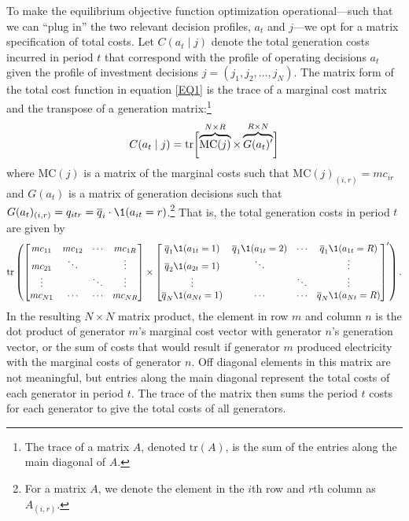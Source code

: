 To make the equilibrium objective function optimization operational---such that we can ``plug in'' the two relevant decision profiles, $a_t$ and $j$---we opt for a matrix specification of total costs. Let $C(a_t \mid j)$ denote the total generation costs incurred in period $t$ that correspond with the profile of operating decisions $a_t$ given the profile of investment decisions $j = (j_1, j_2, \ldots, j_N)$. The matrix form of the total cost function in equation \eqref{EQ1} is the trace of a marginal cost matrix and the transpose of a generation matrix:\footnote{The trace of a matrix $A$, denoted $\text{tr}(A)$, is the sum of the entries along the main diagonal of $A$.} 
\begin{equation}\label{C_matrix}
    C (a_t \mid j) = \text{tr}\biggl[ \overbrace{\text{MC}(j)}^{N \times R} \times \overbrace{G(a_t)'}^{R \times N} \biggr] \\
\end{equation}
where $\text{MC}(j)$ is a matrix of the marginal costs such that $\text{MC}(j)_{(i,r)} = mc_{ir}$ and $G(a_t)$ is a matrix of generation decisions such that $G(a_t)_{(i,r)} = q_{itr} = \overline{q}_i \cdot \1(a_{it} = r)$.\footnote{For a matrix $A$, we denote the element in the $i$th row and $r$th column as $A_{(i,r)}$.} That is, the total generation costs in period $t$ are given by
\[
    \text{tr}\left( 
        \begin{bmatrix}
            mc_{11} & mc_{12} & \cdots & mc_{1R} \\
            mc_{21} & \ddots & & \vdots \\
            \vdots & & \ddots & \vdots \\
            mc_{N1} & \cdots & \cdots  & mc_{NR} 
        \end{bmatrix} \times \begin{bmatrix}
            \overline{q}_1 \1(a_{1t} = 1) & \overline{q}_1 \1(a_{1t} = 2) & \cdots & \overline{q}_1 \1(a_{1t} = R) \\
            \overline{q}_2 \1(a_{2t} = 1) & \ddots & & \vdots \\
            \vdots & & \ddots & \vdots \\
            \overline{q}_N  \1(a_{Nt} = 1) & \cdots & \cdots  & \overline{q}_N  \1(a_{Nt} = R) 
        \end{bmatrix}'
    \right).
\]
In the resulting $N \times N$ matrix product, the element in row $m$ and column $n$ is the dot product of generator $m$'s marginal cost vector with generator $n$'s generation vector, or the sum of costs that would result if generator $m$ produced electricity with the marginal costs of generator $n$. Off diagonal elements in this matrix are not meaningful, but entries along the main diagonal represent the total costs of each generator in period $t$. The trace of the matrix then sums the period $t$ costs for each generator to give the total costs of all generators.

